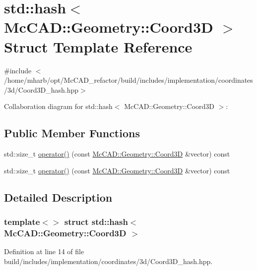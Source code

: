 \hypertarget{structstd_1_1hash_3_01McCAD_1_1Geometry_1_1Coord3D_01_4}{}\section{std\+:\+:hash$<$ Mc\+C\+AD\+:\+:Geometry\+:\+:Coord3D $>$ Struct Template Reference}
\label{structstd_1_1hash_3_01McCAD_1_1Geometry_1_1Coord3D_01_4}


{\ttfamily \#include $<$/home/mharb/opt/\+Mc\+C\+A\+D\+\_\+refactor/build/includes/implementation/coordinates/3d/\+Coord3\+D\+\_\+hash.\+hpp$>$}



Collaboration diagram for std\+:\+:hash$<$ Mc\+C\+AD\+:\+:Geometry\+:\+:Coord3D $>$\+:
\subsection*{Public Member Functions}
\begin{DoxyCompactItemize}
\item 
std\+::size\+\_\+t \hyperlink{structstd_1_1hash_3_01McCAD_1_1Geometry_1_1Coord3D_01_4_a16275a15b6442e2d77d630a8d72c6da9}{operator()} (const \hyperlink{classMcCAD_1_1Geometry_1_1Coord3D}{Mc\+C\+A\+D\+::\+Geometry\+::\+Coord3D} \&vector) const
\item 
std\+::size\+\_\+t \hyperlink{structstd_1_1hash_3_01McCAD_1_1Geometry_1_1Coord3D_01_4_a16275a15b6442e2d77d630a8d72c6da9}{operator()} (const \hyperlink{classMcCAD_1_1Geometry_1_1Coord3D}{Mc\+C\+A\+D\+::\+Geometry\+::\+Coord3D} \&vector) const
\end{DoxyCompactItemize}


\subsection{Detailed Description}
\subsubsection*{template$<$$>$\newline
struct std\+::hash$<$ Mc\+C\+A\+D\+::\+Geometry\+::\+Coord3\+D $>$}



Definition at line 14 of file build/includes/implementation/coordinates/3d/\+Coord3\+D\+\_\+hash.\+hpp.



